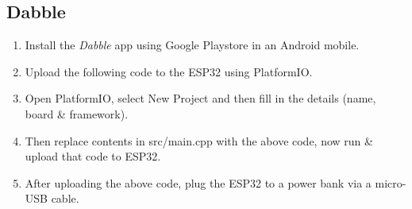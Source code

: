 \documentclass[conference]{IEEEtran}
\begin{document}
\subsection{Dabble}
\begin{enumerate}

\item Install the {\em Dabble} app using Google Playstore in an Android mobile.
\item Upload the following code to the ESP32 using PlatformIO.
\item Open PlatformIO, select New Project and then fill in the details (name, board \& framework).
\item Then replace contents in src/main.cpp with the above code, now run \& upload that code to ESP32.
\item After uploading the above code, plug the ESP32 to a power bank via a micro-USB cable.


\end{enumerate}
\end{document}
